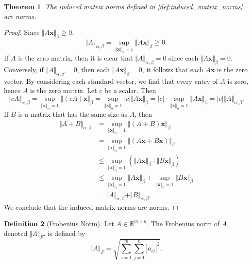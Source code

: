 \documentclass[12pt]{article}
\newtheorem{theorem}{Theorem}[subsection]
\theoremstyle{definition}
\newtheorem{definition}[theorem]{Definition}
\begin{document}
\begin{theorem}
    The induced matrix norms defined in \ref{def:induced_matrix_norms} are norms.
\end{theorem}
\begin{proof}
    Since $\Vert A\mathbf{x}\Vert_\beta \geq 0$,
    \[ \Vert A\Vert_{\alpha,\beta} 
    = \sup_{\Vert\mathbf{x}\Vert_\alpha=1} \Vert A\mathbf{x}\Vert_\beta 
    \geq 0.
    \]
    If $A$ is the zero matrix, then it is clear that $\Vert A\Vert_{\alpha,\beta} = 0$ since each $\Vert A\mathbf{x}\Vert_\beta = 0$. Conversely, if $\Vert A\Vert_{\alpha,\beta} = 0$, then each $\Vert A\mathbf{x}\Vert_\beta = 0$, it follows that each $A\mathbf{x}$ is the zero vector. By considering each standard vector, we find that every entry of $A$ is zero, hence $A$ is the zero matrix.
    Let $c$ be a scalar. Then
    \[ \Vert cA\Vert_{\alpha,\beta}
    = \sup_{\Vert\mathbf{x}\Vert_\alpha=1} \Vert(cA)\mathbf{x}\Vert_\beta
    = \sup_{\Vert\mathbf{x}\Vert_\alpha=1} |c|\Vert A\mathbf{x}\Vert_\beta
    = |c|\cdot \sup_{\Vert\mathbf{x}\Vert_\alpha=1} \Vert A\mathbf{x}\Vert_\beta
    = |c|\Vert A\Vert_{\alpha,\beta}
    .
    \]
    If $B$ is a matrix that has the same size as $A$, then
    \[
    \begin{aligned}
        \Vert A + B \Vert_{\alpha,\beta}
        &= \sup_{\Vert\mathbf{x}\Vert_\alpha=1} \Vert(A+B)\mathbf{x}\Vert_\beta \\
        &= \sup_{\Vert\mathbf{x}\Vert_\alpha=1} \Vert(A\mathbf{x}+B\mathbf{x})\Vert_\beta \\
        &\leq \sup_{\Vert\mathbf{x}\Vert_\alpha=1} (\Vert A\mathbf{x}\Vert_\beta + \Vert B\mathbf{x}\Vert_\beta) \\
        &\leq \sup_{\Vert\mathbf{x}\Vert_\alpha=1} \Vert A\mathbf{x}\Vert_\beta + \sup_{\Vert\mathbf{x}\Vert_\alpha=1} \Vert B\mathbf{x}\Vert_\beta \\
        &= \Vert A\Vert_{\alpha,\beta} + \Vert B\Vert_{\alpha,\beta}
        .
    \end{aligned}
    \]
    We conclude that the induced matrix norms are norms.
\end{proof}


\begin{definition}[Frobenius Norm] \label{def:frobenius_norm}
    Let $A\in\mathbb{R}^{m\times n}$. The Frobenius norm of $A$, denoted $\Vert A\Vert_F$, is defined by
    \[ \Vert A\Vert_F
    = \sqrt{\sum_{i=1}^m \sum_{j=1}^n |a_{ij}|^2}
    .
    \]
\end{definition}
\end{document}
